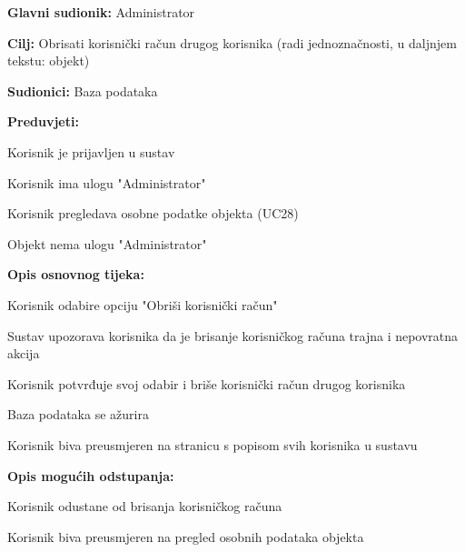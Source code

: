					\noindent {}
					\begin{packed_item}
	
						\item \textbf{Glavni sudionik: }Administrator
						\item  \textbf{Cilj:} Obrisati korisnički račun drugog korisnika (radi jednoznačnosti, u daljnjem tekstu: objekt)
						\item  \textbf{Sudionici:} Baza podataka
						\item  \textbf{Preduvjeti:}
						\item[] \begin{packed_enum}
							\item Korisnik je prijavljen u sustav
							\item Korisnik ima ulogu "Administrator"
							\item Korisnik pregledava osobne podatke objekta (UC28)
							\item Objekt nema ulogu "Administrator"
						\end{packed_enum}
						\item  \textbf{Opis osnovnog tijeka:}
						
						\item[] \begin{packed_enum}
	
							\item Korisnik odabire opciju "Obriši korisnički račun"
							\item Sustav upozorava korisnika da je brisanje korisničkog računa trajna i nepovratna akcija
							\item Korisnik potvrđuje svoj odabir i briše korisnički račun drugog korisnika
							\item Baza podataka se ažurira
							\item Korisnik biva preusmjeren na stranicu s popisom svih korisnika u sustavu
						\end{packed_enum}
						
						\item  \textbf{Opis mogućih odstupanja:}
						
						\item[] \begin{packed_item}
	
							\item[3.a] Korisnik odustane od brisanja korisničkog računa
							\item[] \begin{packed_enum}
								
								\item Korisnik biva preusmjeren na pregled osobnih podataka objekta							
							\end{packed_enum}
							
						\end{packed_item}
					\end{packed_item}
					
